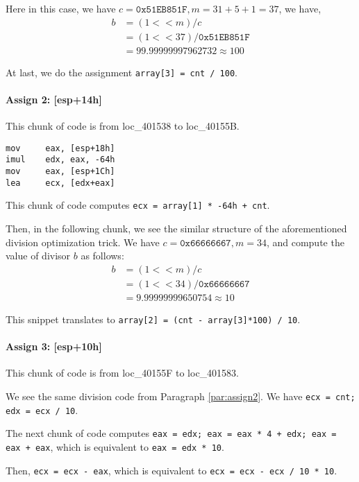 \documentclass[11pt]{article}
\begin{document}
Here in this case, we have $c = \mathtt{0x51EB851F}, m = 31+5+1=37$, we have,
\begin{align*}
    b &= (1 << m) / c \\
    &= (1 << 37) / \mathtt{0x51EB851F} \\
    &=99.99999997962732 \approx 100
\end{align*}

At last, we do the assignment \lstinline{array[3] = cnt / 100}.

\paragraph{Assign 2: [esp+14h]} This chunk of code is from loc\_401538 to loc\_40155B.

\begin{lstlisting}[language={[x86masm]Assembler}]
mov     eax, [esp+18h]
imul    edx, eax, -64h
mov     eax, [esp+1Ch]
lea     ecx, [edx+eax]
\end{lstlisting}

This chunk of code computes \lstinline{ecx = array[1] * -64h + cnt}.

Then, in the following chunk, we see the similar structure of the aforementioned division optimization trick. We have $c=\mathtt{0x66666667}, m = 34$, and compute the value of divisor $b$ as follows:
\begin{align*}
    b &= (1 << m) / c \\
    &= (1 << 34) / \mathtt{0x66666667} \\
    &= 9.99999999650754 \approx 10
\end{align*}\label{par:assign2}

This snippet translates to \lstinline{array[2] = (cnt - array[3]*100) / 10}.

\paragraph{Assign 3: [esp+10h]} This chunk of code is from loc\_40155F to loc\_401583.

We see the same division code from Paragraph \ref{par:assign2}. We have \lstinline{ecx = cnt; edx = ecx / 10}.

The next chunk of code computes \lstinline{eax = edx; eax = eax * 4 + edx; eax = eax + eax}, which is equivalent to \lstinline{eax = edx * 10}. 

Then, \lstinline{ecx = ecx - eax}, which is equivalent to \lstinline{ecx = ecx - ecx / 10 * 10}.
\end{document}
